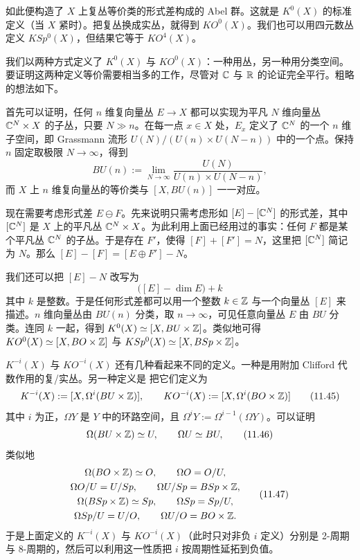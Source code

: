 如此便构造了 $X$ 上复丛等价类的形式差构成的 Abel 群。这就是 $K^0(X)$ 的标准定义（当 $X$ 紧时）。把复丛换成实丛，就得到 $KO^0(X)$。我们也可以用四元数丛定义 $KSp^0(X)$，但结果它等于 $KO^4(X)$。

我们以两种方式定义了 $K^0(X)$ 与 $KO^0(X)$：一种用丛，另一种用分类空间。要证明这两种定义等价需要相当多的工作，尽管对 $\mathbb{C}$ 与 $\mathbb{R}$ 的论证完全平行。粗略的想法如下。

首先可以证明，任何 $n$ 维复向量丛 $E\to X$ 都可以实现为平凡 $N$ 维向量丛 $\mathbb{C}^N\times X$ 的子丛，只要 $N\gg n$。在每一点 $x\in X$ 处，$E_x$ 定义了 $\mathbb{C}^N$ 的一个 $n$ 维子空间，即 Grassmann 流形 $U(N)/(U(n)\times U(N-n))$ 中的一个点。保持 $n$ 固定取极限 $N\to\infty$，得到
\begin{equation}
BU(n):=\lim_{N\to\infty}\frac{U(N)}{U(n)\times U(N-n)}, \tag{11.43}
\end{equation}
而 $X$ 上 $n$ 维复向量丛的等价类与 $[X,BU(n)]$ 一一对应。

现在需要考虑形式差 $E\ominus F$。先来说明只需考虑形如 $[E]-[\mathbb{C}^N]$ 的形式差，其中 $[\mathbb{C}^N]$ 是 $X$ 上的平凡丛 $\mathbb{C}^N\times X$。为此利用上面已经用过的事实：任何 $F$ 都是某个平凡丛 $\mathbb{C}^N$ 的子丛。于是存在 $F'$，使得 $[F]+[F']=N$，这里把 $[\mathbb{C}^N]$ 简记为 $N$。那么 $[E]-[F]=[E\oplus F']-N$。

我们还可以把 $[E]-N$ 改写为
\begin{equation}
\big([E]-\dim E\big)+k \tag{11.44}
\end{equation}
其中 $k$ 是整数。于是任何形式差都可以用一个整数 $k\in\mathbb{Z}$ 与一个向量丛 $[E]$ 来描述。$n$ 维向量丛由 $BU(n)$ 分类，取 $n\to\infty$，可见任意向量丛 $E$ 由 $BU$ 分类。连同 $k$ 一起，得到 $K^0(X)\simeq[X,BU\times\mathbb{Z}]$。类似地可得 $KO^0(X)\simeq[X,BO\times\mathbb{Z}]$ 与 $KSp^0(X)\simeq[X,BSp\times\mathbb{Z}]$。

$K^{-i}(X)$ 与 $KO^{-i}(X)$ 还有几种看起来不同的定义。一种是用附加 Clifford 代数作用的复/实丛。另一种定义是
把它们定义为
\begin{equation}
K^{-i}(X):=[X,\Omega^i(BU\times\mathbb{Z})],\qquad
KO^{-i}(X):=[X,\Omega^i(BO\times\mathbb{Z})] \tag{11.45}
\end{equation}
其中 $i$ 为正，$\Omega Y$ 是 $Y$ 中的环路空间，且 $\Omega^iY:=\Omega^{i-1}(\Omega Y)$。可以证明
\begin{equation}
\Omega(BU\times\mathbb{Z})\simeq U,\qquad \Omega U\simeq BU, \tag{11.46}
\end{equation}
类似地
\begin{equation}
\begin{gathered}
\Omega(BO\times\mathbb{Z})\simeq O,\qquad \Omega O=O/U,\\
\Omega O/U=U/Sp,\qquad \Omega U/Sp=BSp\times\mathbb{Z},\\
\Omega(BSp\times\mathbb{Z})\simeq Sp,\qquad \Omega Sp=Sp/U,\\
\Omega Sp/U=U/O,\qquad \Omega U/O=BO\times\mathbb{Z}.
\end{gathered} \tag{11.47}
\end{equation}
于是上面定义的 $K^{-i}(X)$ 与 $KO^{-i}(X)$（此时只对非负 $i$ 定义）分别是 2-周期与 8-周期的，然后可以利用这一性质把 $i$ 按周期性延拓到负值。

